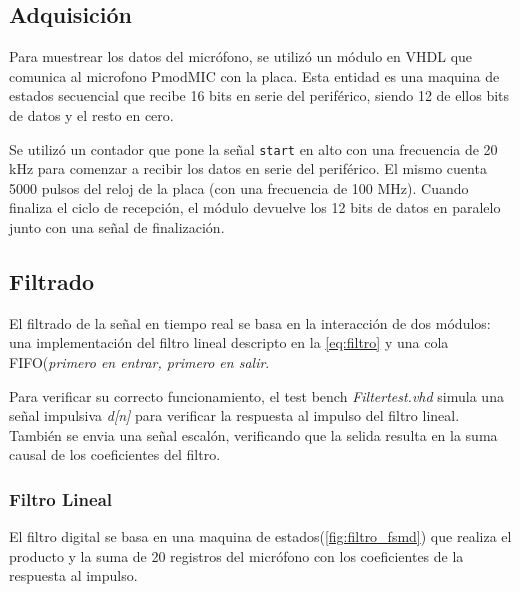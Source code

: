 \documentclass[12pt,letterpaper]{article}
\begin{document}
\subsection{Adquisición}

Para muestrear los datos del micrófono, se utilizó un módulo en VHDL que comunica al microfono PmodMIC con la placa. Esta entidad es una maquina de estados secuencial que recibe 16 bits en serie del periférico, siendo 12 de ellos bits de datos y el resto en cero.

Se utilizó un contador que pone la señal \texttt{start} en alto con una frecuencia de 20 kHz para comenzar a recibir los datos en serie del periférico. El mismo cuenta 5000 pulsos del reloj de la placa (con una frecuencia de 100 MHz). Cuando finaliza el ciclo de recepción, el módulo devuelve los 12 bits de datos en paralelo junto con una señal de finalización.

\subsection{Filtrado}

El filtrado de la señal en tiempo real se basa en la interacción de dos módulos: una implementación del filtro lineal descripto en la \eqref{eq:filtro} y una cola FIFO(\textit{primero en entrar, primero en salir}.

Para verificar su correcto funcionamiento, el test bench \textit{Filtertest.vhd} simula una señal impulsiva \textit{d[n]} para verificar la respuesta al impulso del filtro lineal. También se envia una señal escalón, verificando que la selida resulta en la suma causal de los coeficientes del filtro.

\subsubsection{Filtro Lineal}

El filtro digital se basa en una maquina de estados(\ref{fig:filtro_fsmd}) que realiza el producto y la suma de 20 registros del micrófono con los coeficientes de la respuesta al impulso. 
\end{document}

